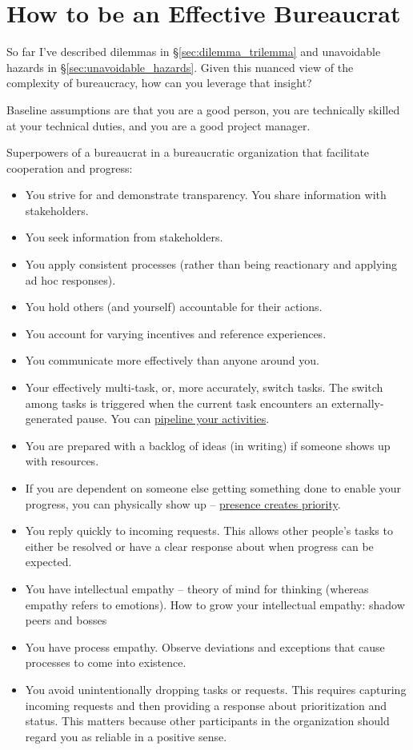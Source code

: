 \section{How to be an Effective Bureaucrat\label{sec:effective_bureaucrat}}

So far I've described dilemmas in \S\ref{sec:dilemma_trilemma} and unavoidable hazards in \S\ref{sec:unavoidable_hazards}. Given this nuanced view of the complexity of bureaucracy, how can you leverage that insight?

Baseline assumptions are that you are a good person, you are technically skilled at your technical duties, and you are a good project manager. 


Superpowers of a bureaucrat in a bureaucratic organization that facilitate cooperation and progress:

\begin{itemize}
\item You strive for and demonstrate transparency. You share information with stakeholders.
\item You seek information from stakeholders.
\item You apply consistent processes (rather than being reactionary and applying ad hoc responses).
\item You hold others (and yourself) accountable for their actions.
\item You account for varying incentives and reference experiences.
    \item You communicate more effectively than anyone around you.
    \item Your effectively multi-task, or, more accurately, switch tasks. The switch among tasks is triggered when the current task encounters an externally-generated pause. You can \href{https://en.wikipedia.org/wiki/Pipeline_(computing)#Concept_and_motivation}{pipeline your activities}.
    \item You are prepared with a backlog of ideas (in writing) if someone shows up with resources.
    \item If you are dependent on someone else getting something done to enable your progress, you can physically show up -- \underline{presence creates priority}.
    \item You reply quickly to incoming requests. This allows other people's tasks to either be resolved or have a clear response about when progress can be expected. 
    \item You have intellectual empathy -- theory of mind for thinking (whereas empathy refers to emotions). How to grow your intellectual empathy: shadow peers and bosses
    \item You have process empathy. Observe deviations and exceptions that cause processes to come into existence. 
    \item You avoid unintentionally dropping tasks or requests. This requires capturing incoming requests and then providing a response about prioritization and status. This matters because other participants in the organization should regard you as reliable in a positive sense. 
\end{itemize}

